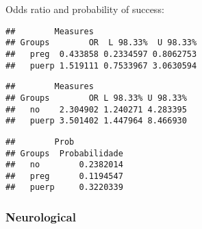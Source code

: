 \documentclass[
]{article}
\newenvironment{Shaded}{\begin{snugshade}}{\end{snugshade}}
\newcommand{\CommentTok}[1]{\textcolor[rgb]{0.56,0.35,0.01}{\textit{#1}}}
\newcommand{\KeywordTok}[1]{\textcolor[rgb]{0.13,0.29,0.53}{\textbf{#1}}}
\newcommand{\NormalTok}[1]{#1}
\newcommand{\OperatorTok}[1]{\textcolor[rgb]{0.81,0.36,0.00}{\textbf{#1}}}
\newcommand{\StringTok}[1]{\textcolor[rgb]{0.31,0.60,0.02}{#1}}
\begin{document}
Odds ratio and probability of success:

\begin{Shaded}
\end{Shaded}

\begin{verbatim}
##        Measures
## Groups        OR  L 98.33%  U 98.33%
##   preg  0.433858 0.2334597 0.8062753
##   puerp 1.519111 0.7533967 3.0630594
\end{verbatim}

\begin{Shaded}
\end{Shaded}

\begin{verbatim}
##        Measures
## Groups        OR L 98.33% U 98.33%
##   no    2.304902 1.240271 4.283395
##   puerp 3.501402 1.447964 8.466930
\end{verbatim}

\begin{Shaded}
\end{Shaded}

\begin{verbatim}
##        Prob
## Groups  Probabilidade
##   no        0.2382014
##   preg      0.1194547
##   puerp     0.3220339
\end{verbatim}

\hypertarget{neurological-1}{%
\subsubsection{Neurological}\label{neurological-1}}

\begin{Shaded}
\end{Shaded}
\end{document}

